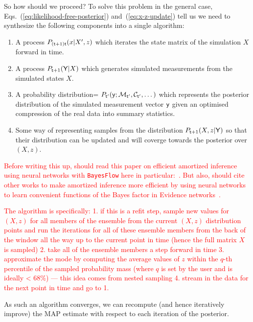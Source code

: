 So how should we proceed? To solve this problem in the general case, Eqs.~(\ref{eq:likelihood-free-posterior}) and~(\ref{eq:x-z-update}) tell us we need to synthesize the following components into a single algorithm:
\begin{enumerate}
\item{A process $P_{({\sf t}+1){\sf t}}(x\vert X', z)$ which iterates the state matrix of the simulation $X$ forward in time.}
\item{A process $P_{{\sf t}+1}({\sf Y}\vert X)$ which generates simulated measurements from the simulated states $X$.}
\item{A probability distribution= $P_{{\sf t}'}({\sf y};{\cal M}_{{\sf t}'},{\cal C}_{{\sf t}'}, \dots )$ which represents the posterior distribution of the simulated measurement vector ${\sf y}$ given an optimised compression of the real data into summary statistics.}
\item{Some way of representing samples from the distribution $P_{{\sf t}+1}(X,z\vert {\sf Y})$ so that their distribution can be updated and will coverge towards the posterior over $(X,z)$.}
\end{enumerate}

\textcolor{red}{
Before writing this up, should read this paper on efficient amortized inference using neural networks with \texttt{BayesFlow} here in particular:~\cite{radev2020bayesflow}. But also, should cite other works to make amortized inference more efficient by using neural networks to learn convenient functions of the Bayes factor in Evidence networks~\cite{jeffrey2023evidence}.
}


\textcolor{red}{The algorithm is specifically: 
1. if this is a refit step, sample new values for $(X,z)$ for all members of the ensemble from the current $(X,z)$ distribution points and run the iterations for all of these ensemble members from the back of the window all the way up to the current point in time (hence the full matrix $X$ is sampled)
2. take all of the ensemble members a step forward in time
3. approximate the mode by computing the average values of $z$ within the $q$-th percentile of the sampled probability mass (where $q$ is set by the user and is ideally < 68\%) --- this idea comes from nested sampling
4. stream in the data for the next point in time and go to 1.}


As such an algorithm converges, we can recompute (and hence iteratively improve) the MAP estimate with respect to each iteration of the posterior.

